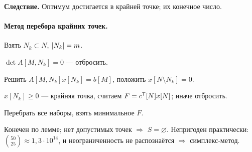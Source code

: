 \textbf{Следствие.} Оптимум достигается в крайней точке; их конечное число.

\paragraph{Метод перебора крайних точек.}
\begin{steps}
  \item Взять $N_k \subset N$, $\left\lvert N_k \right\rvert = m$.
  \item $\det A[M,N_k] = 0$ — отбросить.
  \item Решить $A[M,N_k]x[N_k] = b[M]$, положить $x[N \setminus N_k] = 0$.
  \item $x[N_k] \ge 0$ — крайняя точка, считаем $F = c^{\mathsf{T}}[N]x[N]$; иначе
        отбросить.
  \item Перебрать все наборы, взять минимальное $F$.
\end{steps}

Конечен по лемме; нет допустимых точек $\Rightarrow$ $S = \varnothing$.
Непригоден практически: $\binom{50}{25} \approx 1{,}3\cdot10^{14}$, и
неограниченность не распознаётся $\Rightarrow$ симплекс-метод.

